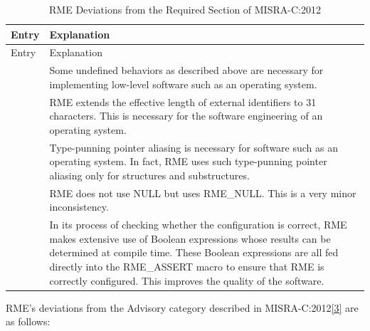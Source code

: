 \begin{xltabular}{\textwidth}{@{}>{\hsize\raggedright\arraybackslash}X>{\hsize\raggedright\arraybackslash}X@{}}
\caption{RME Deviations from the Required Section of MISRA-C:2012}\label{tab:9-6-misra-required-deviations}\\
\toprule
Entry & Explanation\tabularnewline
\endfirsthead
\toprule
Entry & Explanation\tabularnewline
\midrule
\endhead
\bottomrule
{} &
Some undefined behaviors as described above are necessary for implementing low-level software such as an operating system. &
RME extends the effective length of external identifiers to 31 characters. This is necessary for the software engineering of an operating system. &
Type-punning pointer aliasing is necessary for software such as an operating system. In fact, RME uses such type-punning pointer aliasing only for structures and substructures. & RME does not use NULL but uses RME\_NULL. This is a very minor inconsistency. &
In its process of checking whether the configuration is correct, RME makes extensive use of Boolean expressions whose results can be determined at compile time. These Boolean expressions are all fed directly into the RME\_ASSERT macro to ensure that RME is correctly configured. This improves the quality of the software.\tabularnewline
\end{xltabular}
\nopagebreak[4]

\newpage
{}
RME's deviations from the Advisory category described in MISRA-C:2012\hyperref[cite:9-3]{{[}3{]}} are as follows:

